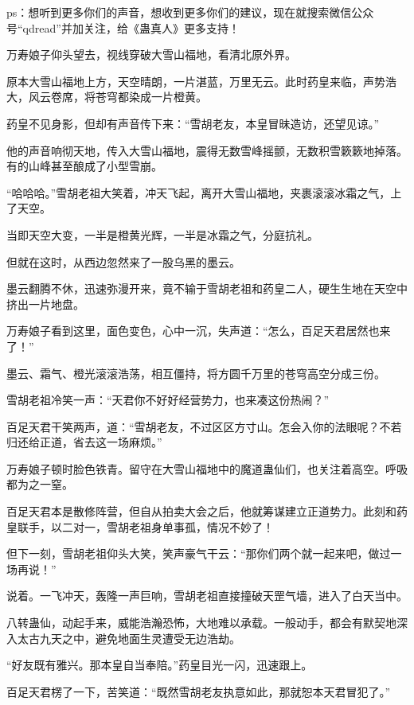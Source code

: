 
\begin{this_body}

ps：想听到更多你们的声音，想收到更多你们的建议，现在就搜索微信公众号“qdread”并加关注，给《蛊真人》更多支持！

万寿娘子仰头望去，视线穿破大雪山福地，看清北原外界。

原本大雪山福地上方，天空晴朗，一片湛蓝，万里无云。此时药皇来临，声势浩大，风云卷席，将苍穹都染成一片橙黄。

药皇不见身影，但却有声音传下来：“雪胡老友，本皇冒昧造访，还望见谅。”

他的声音响彻天地，传入大雪山福地，震得无数雪峰摇颤，无数积雪簌簌地掉落。有的山峰甚至酿成了小型雪崩。

“哈哈哈。”雪胡老祖大笑着，冲天飞起，离开大雪山福地，夹裹滚滚冰霜之气，上了天空。

当即天空大变，一半是橙黄光辉，一半是冰霜之气，分庭抗礼。

但就在这时，从西边忽然来了一股乌黑的墨云。

墨云翻腾不休，迅速弥漫开来，竟不输于雪胡老祖和药皇二人，硬生生地在天空中挤出一片地盘。

万寿娘子看到这里，面色变色，心中一沉，失声道：“怎么，百足天君居然也来了！”

墨云、霜气、橙光滚滚浩荡，相互僵持，将方圆千万里的苍穹高空分成三份。

雪胡老祖冷笑一声：“天君你不好好经营势力，也来凑这份热闹？”

百足天君干笑两声，道：“雪胡老友，不过区区方寸山。怎会入你的法眼呢？不若归还给正道，省去这一场麻烦。”

万寿娘子顿时脸色铁青。留守在大雪山福地中的魔道蛊仙们，也关注着高空。呼吸都为之一窒。

百足天君本是散修阵营，但自从拍卖大会之后，他就筹谋建立正道势力。此刻和药皇联手，以二对一，雪胡老祖身单事孤，情况不妙了！

但下一刻，雪胡老祖仰头大笑，笑声豪气干云：“那你们两个就一起来吧，做过一场再说！”

说着。一飞冲天，轰隆一声巨响，雪胡老祖直接撞破天罡气墙，进入了白天当中。

八转蛊仙，动起手来，威能浩瀚恐怖，大地难以承载。一般动手，都会有默契地深入太古九天之中，避免地面生灵遭受无边浩劫。

“好友既有雅兴。那本皇自当奉陪。”药皇目光一闪，迅速跟上。

百足天君楞了一下，苦笑道：“既然雪胡老友执意如此，那就恕本天君冒犯了。”


\end{this_body}
